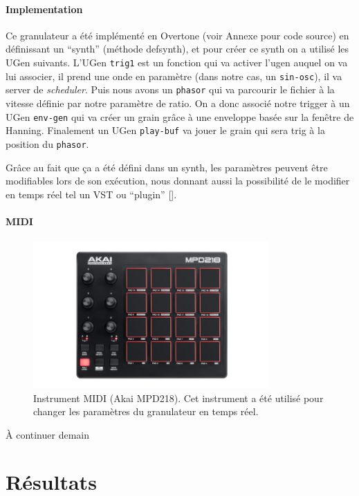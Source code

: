 \documentclass[letterpaper]{article}
\begin{document}
\paragraph{Implementation}
Ce granulateur a été implémenté en Overtone (voir Annexe pour code source) en définissant
un ``synth'' (méthode defsynth), et pour créer ce synth on a utilisé les UGen suivants.
L'UGen \verb+trig1+ est un fonction qui va activer l'ugen auquel on va lui associer, il
prend une onde en paramètre (dans notre cas, un \verb+sin-osc+), il va server de \emph{scheduler}.
Puis nous avons un \verb+phasor+ qui va parcourir le fichier à la vitesse définie par notre paramètre
de ratio. On a donc associé notre trigger à un UGen \verb+env-gen+ qui va créer un grain grâce à
une enveloppe basée sur la fenêtre de Hanning. Finalement un UGen \verb+play-buf+ va jouer le grain
qui sera trig à la position du \verb+phasor+.

Grâce au fait que ça a été défini dans un synth, les paramètres peuvent être modifiables lors de son
exécution, nous donnant aussi la possibilité de le modifier en temps réel tel un VST ou ``plugin''
[\cite{VST}].

\paragraph {MIDI}

\begin{figure}[h]
    \centerline{\includegraphics[width=9cm]{res/mpd218.png}}
    \caption{\label{fig:mpd218}
      Instrument MIDI (Akai MPD218). Cet instrument a été utilisé pour
      changer les paramètres du granulateur en temps réel.
    }
  \end{figure}

À continuer demain
\section{Résultats}

\end{document}
